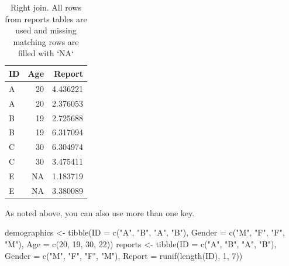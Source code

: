 \documentclass[
]{book}
\newenvironment{Shaded}{\begin{snugshade}}{\end{snugshade}}
\newcommand{\AttributeTok}[1]{\textcolor[rgb]{0.77,0.63,0.00}{#1}}
\newcommand{\DecValTok}[1]{\textcolor[rgb]{0.00,0.00,0.81}{#1}}
\newcommand{\FunctionTok}[1]{\textcolor[rgb]{0.00,0.00,0.00}{#1}}
\newcommand{\NormalTok}[1]{#1}
\newcommand{\OtherTok}[1]{\textcolor[rgb]{0.56,0.35,0.01}{#1}}
\newcommand{\StringTok}[1]{\textcolor[rgb]{0.31,0.60,0.02}{#1}}
\begin{document}
\begin{table}

\caption{\label{tab:unnamed-chunk-188}Right join. All rows from reports tables are used and missing matching rows are filled with `NA`}
\centering
\begin{tabular}[t]{l|r|r}
\hline
ID & Age & Report\\
\hline
A & 20 & 4.436221\\
\hline
A & 20 & 2.376053\\
\hline
B & 19 & 2.725688\\
\hline
B & 19 & 6.317094\\
\hline
C & 30 & 6.304974\\
\hline
C & 30 & 3.475411\\
\hline
E & NA & 1.183719\\
\hline
E & NA & 3.380089\\
\hline
\end{tabular}
\end{table}

As noted above, you can also use more than one key.

\begin{Shaded}
\begin{Highlighting}[]
\NormalTok{demographics }\OtherTok{\textless{}{-}} \FunctionTok{tibble}\NormalTok{(}\AttributeTok{ID =} \FunctionTok{c}\NormalTok{(}\StringTok{"A"}\NormalTok{, }\StringTok{"B"}\NormalTok{, }\StringTok{"A"}\NormalTok{, }\StringTok{"B"}\NormalTok{),}
                       \AttributeTok{Gender =} \FunctionTok{c}\NormalTok{(}\StringTok{"M"}\NormalTok{, }\StringTok{"F"}\NormalTok{, }\StringTok{"F"}\NormalTok{, }\StringTok{"M"}\NormalTok{),}
                       \AttributeTok{Age =} \FunctionTok{c}\NormalTok{(}\DecValTok{20}\NormalTok{, }\DecValTok{19}\NormalTok{, }\DecValTok{30}\NormalTok{, }\DecValTok{22}\NormalTok{))}
\NormalTok{reports }\OtherTok{\textless{}{-}} \FunctionTok{tibble}\NormalTok{(}\AttributeTok{ID =} \FunctionTok{c}\NormalTok{(}\StringTok{"A"}\NormalTok{, }\StringTok{"B"}\NormalTok{, }\StringTok{"A"}\NormalTok{, }\StringTok{"B"}\NormalTok{),}
                  \AttributeTok{Gender =} \FunctionTok{c}\NormalTok{(}\StringTok{"M"}\NormalTok{, }\StringTok{"F"}\NormalTok{, }\StringTok{"F"}\NormalTok{, }\StringTok{"M"}\NormalTok{),}
                  \AttributeTok{Report =} \FunctionTok{runif}\NormalTok{(}\FunctionTok{length}\NormalTok{(ID), }\DecValTok{1}\NormalTok{, }\DecValTok{7}\NormalTok{))}
\end{Highlighting}
\end{Shaded}
\end{document}
